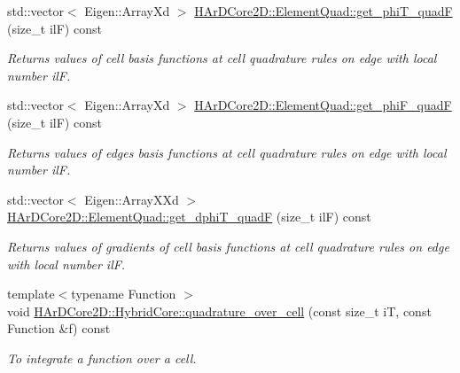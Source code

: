 \begin{DoxyCompactItemize}
\mbox{\label{group__HybridCore_ga89dc78ee0eea49e4a9725ed7df748ba9}} 
std\+::vector$<$ Eigen\+::\+Array\+Xd $>$ \hyperlink{group__HybridCore_ga89dc78ee0eea49e4a9725ed7df748ba9}{H\+Ar\+D\+Core2\+D\+::\+Element\+Quad\+::get\+\_\+phi\+T\+\_\+quadF} (size\+\_\+t ilF) const
\begin{DoxyCompactList}\small\item\em Returns values of cell basis functions at cell quadrature rules on edge with local number ilF. \end{DoxyCompactList}\item 
\mbox{\label{group__HybridCore_ga2c8a70eb42762e460ad31e4d43afb0e8}} 
std\+::vector$<$ Eigen\+::\+Array\+Xd $>$ \hyperlink{group__HybridCore_ga2c8a70eb42762e460ad31e4d43afb0e8}{H\+Ar\+D\+Core2\+D\+::\+Element\+Quad\+::get\+\_\+phi\+F\+\_\+quadF} (size\+\_\+t ilF) const
\begin{DoxyCompactList}\small\item\em Returns values of edges basis functions at cell quadrature rules on edge with local number ilF. \end{DoxyCompactList}\item 
\mbox{\label{group__HybridCore_ga11e133360ae70b9aef714054b7de76a4}} 
std\+::vector$<$ Eigen\+::\+Array\+X\+Xd $>$ \hyperlink{group__HybridCore_ga11e133360ae70b9aef714054b7de76a4}{H\+Ar\+D\+Core2\+D\+::\+Element\+Quad\+::get\+\_\+dphi\+T\+\_\+quadF} (size\+\_\+t ilF) const
\begin{DoxyCompactList}\small\item\em Returns values of gradients of cell basis functions at cell quadrature rules on edge with local number ilF. \end{DoxyCompactList}\item 
\mbox{\label{group__HybridCore_ga3c33c8cec55dbe2d8873e53fcd43d01f}} 
{\footnotesize template$<$typename Function $>$ }\\void \hyperlink{group__HybridCore_ga3c33c8cec55dbe2d8873e53fcd43d01f}{H\+Ar\+D\+Core2\+D\+::\+Hybrid\+Core\+::quadrature\+\_\+over\+\_\+cell} (const size\+\_\+t iT, const Function \&f) const
\begin{DoxyCompactList}\small\item\em To integrate a function over a cell. \end{DoxyCompactList}\item 

\end{DoxyCompactItemize}
